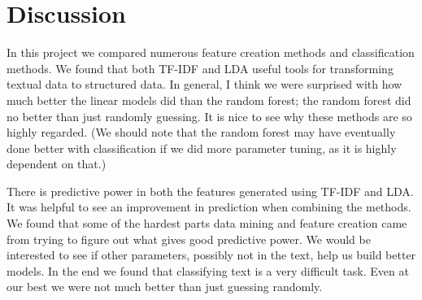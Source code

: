 \documentclass[11pt]{article}
\begin{document}
\section{Discussion}
\label{sec:discussion}

In this project we compared numerous feature creation methods and classification methods. We found that both TF-IDF and LDA useful tools for transforming textual data to structured data. In general, I think we were surprised with how much better the linear models did than the random forest; the random forest did no better than just randomly guessing. It is nice to see why these methods are so highly regarded. (We should note that the random forest may have eventually done better with classification if we did more parameter tuning, as it is highly dependent on that.)

There is predictive power in both the features generated using TF-IDF and LDA. It was helpful to see an improvement in prediction when combining the methods. We found that some of the hardest parts data mining and feature creation came from trying to figure out what gives good predictive power. We would be interested to see if other parameters, possibly not in the text, help us build better models. In the end we found that classifying text is a very difficult task. Even at our best we were not much better than just guessing randomly.

{}

\end{document}
